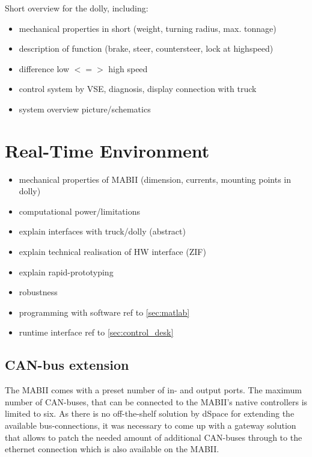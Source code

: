 \documentclass[ExampleMasters.tex]{subfiles}
\begin{document}
Short overview for the dolly, including: 

\begin{itemize}
\item mechanical properties in short (weight, turning radius, max. tonnage)
\item description of function (brake, steer, countersteer, lock at highspeed)
\item difference low $<=>$ high speed
\item control system by VSE, diagnosis, display connection with truck
\item system overview picture/schematics

\end{itemize}
\section{Real-Time Environment}
\label{sec:realtime_environment}



\begin{itemize}
	\item mechanical properties of MABII (dimension, currents, mounting points in dolly)
	\item computational power/limitations
	\item explain interfaces with truck/dolly (abstract)
	\item explain technical realisation of HW interface (ZIF)
	\item explain rapid-prototyping
	\item robustness
	\item programming with software ref to \ref{sec:matlab}
	\item runtime interface ref to \ref{sec:control_desk}
\end{itemize}
\subsection{CAN-bus extension}
\label{sec:can_udp_gateway}
The MABII comes with a preset number of in- and output ports. The maximum number of CAN-buses, that can be connected to the MABII's native controllers is limited to six. As there is no off-the-shelf solution by dSpace for extending the available bus-connections, it was necessary to come up with a gateway solution that allows to patch the needed amount of additional CAN-buses through to the ethernet connection which is also available on the MABII. 
\end{document}
